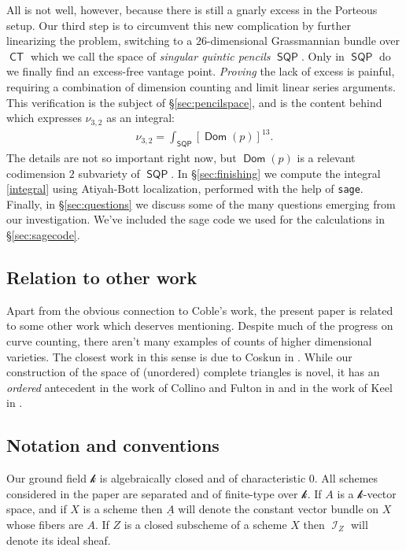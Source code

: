 \documentclass[reqno, 11pt]{amsart}
\theoremstyle{plain}
\theoremstyle{remark}
\renewcommand{\k}{\mathscr{k}}
\DeclareMathOperator{\I}{\mathcal{I}}
\DeclareMathOperator{\CT}{\mathsf{CT}}
\DeclareMathOperator{\SQP}{\mathsf{SQP}}
\DeclareMathOperator{\Dom}{\mathsf{Dom}}
\begin{document}
All is not well, however, because there is still a gnarly excess in the Porteous setup.  Our third step is to circumvent this new complication by further linearizing the problem,  switching to a $26$-dimensional Grassmannian bundle over $\CT$ which we call the space of \emph{singular quintic pencils} $\SQP$.  Only in $\SQP$ do we finally find an excess-free vantage point.  \emph{Proving} the lack of excess is painful, requiring a combination of dimension counting and limit linear series arguments.  This  verification is the subject of \S \ref{sec:pencilspace}, and is the content behind  which expresses $\nu_{3,2}$ as an integral: 
\begin{align}
\label{integral}
\nu_{3,2} = \int_{\SQP} \left[\Dom(p) \right]^{13}.
\end{align}  The details are not so important right now, but $\Dom(p)$ is a relevant codimension $2$ subvariety of $\SQP$.   In \S \ref{sec:finishing} we compute the integral \eqref{integral} using Atiyah-Bott localization, performed with the help of \texttt{sage}. Finally, in \S \ref{sec:questions} we discuss some of the many questions emerging from our investigation. We've included the sage code we used for the calculations in \S \ref{sec:sagecode}. 



\subsection{Relation to other work} Apart from the obvious connection to Coble's work, the present paper is related to some other work which deserves mentioning.  Despite much of the progress on curve counting, there aren't many examples of counts of higher dimensional varieties.  The closest work in this sense is due to Coskun in \cite{coskun2006enumerative, coskun2006degenerations}.  While our construction of the space of (unordered) complete triangles is novel, it has an {\sl ordered} antecedent in the work of Collino and Fulton in \cite{collino1989intersection} and in the work of Keel in \cite{keel1993functorial}. 

\subsection{Notation and conventions}

Our ground field $\k$ is algebraically closed and of characteristic $0$.  All schemes considered in the paper are separated and of finite-type over $\k$.  If $A$ is a $\k$-vector space, and if $X$ is a scheme then $\underline{A}$ will denote the constant vector bundle on $X$ whose fibers are $A$. If $Z$ is a closed subscheme of a scheme $X$ then $\I_{Z}$ will denote its ideal sheaf.  
\end{document}
